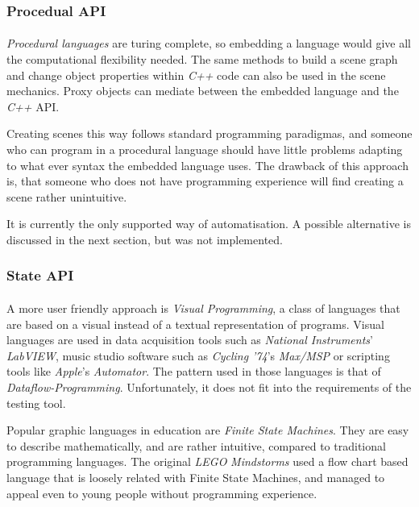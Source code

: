 \subsubsection{Procedual API}
\paragraph{}
\textit{Procedural languages} are turing complete, so embedding a language would give all the computational flexibility needed. The same methods to build a scene graph and change object properties within \textit{C++} code can also be used in the scene mechanics. Proxy objects can mediate between the embedded language and the \textit{C++} API.

Creating scenes this way follows standard programming paradigmas, and someone who can program in a procedural language should have little problems adapting to what ever syntax the embedded language uses. The drawback of this approach is, that someone who does not have programming experience will find creating a scene rather unintuitive.

It is currently the only supported way of automatisation.
A possible alternative is discussed in the next section, but was not implemented.

\subsubsection{State API}
\paragraph{}
A more user friendly approach is \textit{Visual Programming}, a class of languages that are based on a visual instead of a textual representation of programs. Visual languages are used in data acquisition tools such as \textit{National Instruments}' \textit{LabVIEW}, music studio software such as \textit{Cycling '74}'s \textit{Max/MSP} or scripting tools like \textit{Apple}'s \textit{Automator}.
The pattern used in those languages is that of \textit{Dataflow-Programming}\cite{dataflow}. Unfortunately, it does not fit into the requirements of the testing tool.

Popular graphic languages in education are \textit{Finite State Machines}\cite{fsm}. They are easy to describe mathematically, and are rather intuitive, compared to traditional programming languages.
The original \textit{LEGO} \textit{Mindstorms} used a flow chart based language that is loosely related with Finite State Machines, and managed to appeal even to young people without programming experience.


